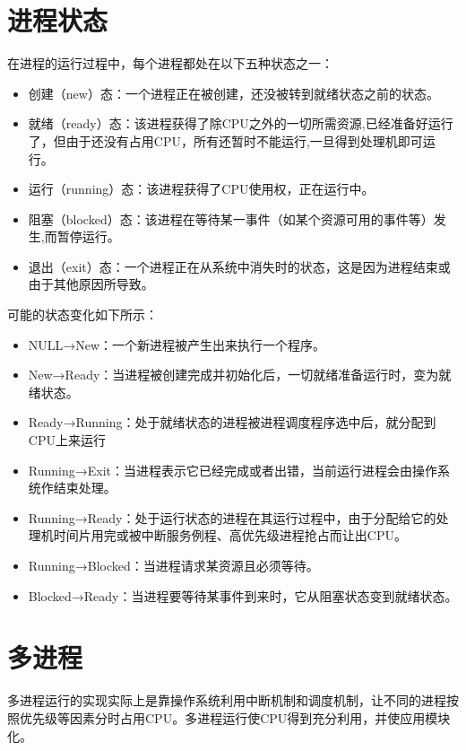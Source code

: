 \documentclass[a4paper,12pt]{report}
\begin{document}
\begin{appendix}
\section{ 进程状态}
\begin{spacing}{1.5}
 在进程的运行过程中，每个进程都处在以下五种状态之一：
 \begin{itemize}
   \item 	创建（new）态：一个进程正在被创建，还没被转到就绪状态之前的状态。
   \item 	就绪（ready）态：该进程获得了除CPU之外的一切所需资源,已经准备好运行了，但由于还没有占用CPU，所有还暂时不能运行,一旦得到处理机即可运行。
   \item 	运行（running）态：该进程获得了CPU使用权，正在运行中。
   \item 	阻塞（blocked）态：该进程在等待某一事件（如某个资源可用的事件等）发生,而暂停运行。
   \item 	退出（exit）态：一个进程正在从系统中消失时的状态，这是因为进程结束或由于其他原因所导致。
 \end{itemize}
 可能的状态变化如下所示：
 \begin{itemize}
   \item 	NULL→New：一个新进程被产生出来执行一个程序。
   \item 	New→Ready：当进程被创建完成并初始化后，一切就绪准备运行时，变为就绪状态。
   \item 	Ready→Running：处于就绪状态的进程被进程调度程序选中后，就分配到CPU上来运行
   \item 	Running→Exit：当进程表示它已经完成或者出错，当前运行进程会由操作系统作结束处理。
   \item 	Running→Ready：处于运行状态的进程在其运行过程中，由于分配给它的处理机时间片用完或被中断服务例程、高优先级进程抢占而让出CPU。
   \item 	Running→Blocked：当进程请求某资源且必须等待。
   \item 	Blocked→Ready：当进程要等待某事件到来时，它从阻塞状态变到就绪状态。
 \end{itemize}
\end{spacing}


\section{ 多进程}
\begin{spacing}{1.5}

    多进程运行的实现实际上是靠操作系统利用中断机制和调度机制，让不同的进程按照优先级等因素分时占用CPU。多进程运行使CPU得到充分利用，并使应用模块化。
\end{spacing}


\end{appendix}
\end{document}
